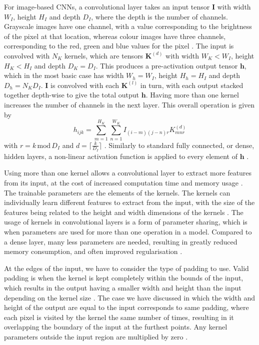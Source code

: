 \documentclass[12pt]{article}
\begin{document}
For image-based CNNs, a convolutional layer takes an input tensor $\bm{I}$ with width $W_I$, height $H_I$ and depth $D_I$, where the depth is the number of channels. Grayscale images have one channel, with a value corresponding to the brightness of the pixel at that location, whereas colour images have three channels, corresponding to the red, green and blue values for the pixel \cite{Aghdam17, Goodfellow16}. The input is convolved with $N_K$ kernels, which are tensors $\bm{K}^{(d)}$ with width $W_K<W_I$, height $H_K<H_I$ and depth $D_K=D_I$. This produces a pre-activation output tensor $\bm{\bm{h}}$, which in the most basic case has width $W_h=W_I$, height $H_h=H_I$ and depth $D_h=N_KD_I$. $\bm{I}$ is convolved with each $\bm{K}^{(l)}$ in turn, with each output stacked together depth-wise to give the total output $\bm{h}$. Having more than one kernel increases the number of channels in the next layer. This overall operation is given by
\begin{equation}
h_{ijk}=\sum_{m=1}^{H_K}\sum_{n=1}^{W_K}I_{(i-m)(j-n)r}K_{mnr}^{(d)}
\end{equation}
with $r=k\,\mathrm{mod}\,D_I$ and $d=\lceil\frac{k}{D_I}\rceil$ \cite{Aghdam17, Goodfellow16}. Similarly to standard fully connected, or dense, hidden layers, a non-linear activation function is applied to every element of $\bm{h}$ \cite{Aghdam17, Goodfellow16}. 

Using more than one kernel allows a convolutional layer to extract more features from its input, at the cost of increased computation time and memory usage \cite{Goodfellow16}. The trainable parameters are the elements of the kernels. The kernels can individually learn different features to extract from the input, with the size of the features being related to the height and width dimensions of the kernels \cite{Aghdam17, Goodfellow16}. The usage of kernels in convolutional layers is a form of parameter sharing, which is when parameters are used for more than one operation in a model. Compared to a dense layer, many less parameters are needed, resulting in greatly reduced memory consumption, and often improved regularisation \cite{Aghdam17, Goodfellow16}. 

At the edges of the input, we have to consider the type of padding to use. Valid padding is when the kernel is kept completely within the bounds of the input, which results in the output having a smaller width and height than the input depending on the kernel size \cite{Aghdam17, Goodfellow16}. The case we have discussed in which the width and height of the output are equal to the input corresponds to same padding, where each pixel is visited by the kernel the same number of times, resulting in it overlapping the boundary of the input at the furthest points. Any kernel parameters outside the input region are multiplied by zero \cite{Aghdam17, Goodfellow16}.
\end{document}
